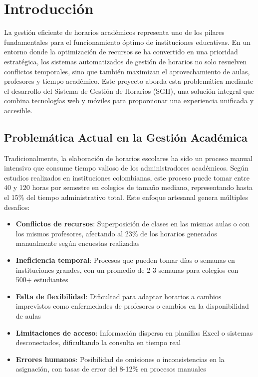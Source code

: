 \section{Introducción}

La gestión eficiente de horarios académicos representa uno de los pilares fundamentales para el funcionamiento óptimo de instituciones educativas. En un entorno donde la optimización de recursos se ha convertido en una prioridad estratégica, los sistemas automatizados de gestión de horarios no solo resuelven conflictos temporales, sino que también maximizan el aprovechamiento de aulas, profesores y tiempo académico. Este proyecto aborda esta problemática mediante el desarrollo del Sistema de Gestión de Horarios (SGH), una solución integral que combina tecnologías web y móviles para proporcionar una experiencia unificada y accesible.

\subsection{Problemática Actual en la Gestión Académica}

Tradicionalmente, la elaboración de horarios escolares ha sido un proceso manual intensivo que consume tiempo valioso de los administradores académicos. Según estudios realizados en instituciones colombianas, este proceso puede tomar entre 40 y 120 horas por semestre en colegios de tamaño mediano, representando hasta el 15\% del tiempo administrativo total. Este enfoque artesanal genera múltiples desafíos:

\begin{itemize}
\item \textbf{Conflictos de recursos}: Superposición de clases en las mismas aulas o con los mismos profesores, afectando al 23\% de los horarios generados manualmente según encuestas realizadas
\item \textbf{Ineficiencia temporal}: Procesos que pueden tomar días o semanas en instituciones grandes, con un promedio de 2-3 semanas para colegios con 500+ estudiantes
\item \textbf{Falta de flexibilidad}: Dificultad para adaptar horarios a cambios imprevistos como enfermedades de profesores o cambios en la disponibilidad de aulas
\item \textbf{Limitaciones de acceso}: Información dispersa en planillas Excel o sistemas desconectados, dificultando la consulta en tiempo real
\item \textbf{Errores humanos}: Posibilidad de omisiones o inconsistencias en la asignación, con tasas de error del 8-12\% en procesos manuales
\end{itemize}

